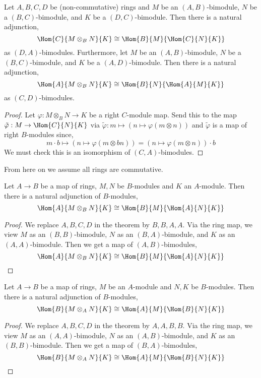\documentclass[12pt]{article}
\begin{document}
\begin{theorem}
Let $A, B, C, D$ be (non-commutative) rings and $M$ be an $(A, B)$-bimodule, $N$ be a $(B, C)$-bimodule, and $K$ be a $(D, C)$-bimodule. Then there is a natural adjunction,
\[ \Hom{C}{M \otimes_B N}{K} \cong \Hom{B}{M}{\Hom{C}{N}{K}} \]
as $(D, A)$-bimodules. Furthermore, let $M$ be an $(A, B)$-bimodule, $N$ be a $(B, C)$-bimodule, and $K$ be a $(A, D)$-bimodule. Then there is a natural adjunction,
\[ \Hom{A}{M \otimes_B N}{K} \cong \Hom{B}{N}{\Hom{A}{M}{K}} \]
as $(C, D)$-bimodules.
\end{theorem}

\begin{proof}
Let $\varphi : M \otimes_B N \to K$ be a right $C$-module map. Send this to the map $\tilde{\varphi} : M \to \Hom{C}{N}{K}$ via $\tilde{\varphi} : m \mapsto (n \mapsto \varphi(m \otimes n))$ and $\tilde{\varphi}$ is a map of right $B$-modules since,
\[ m \cdot b \mapsto (n \mapsto \varphi(m \otimes b n)) = (n \mapsto \varphi(m \otimes n)) \cdot b \]
We must check this is an isomorphism of $(C, A)$-bimodules. 
\end{proof}

\begin{rmk}
From here on we assume all rings are commutative. 
\end{rmk}

\begin{cor}
Let $A \to B$ be a map of rings, $M, N$ be $B$-modules and $K$ an $A$-module. Then there is a natural adjunction of $B$-modules,
\[ \Hom{A}{M \otimes_B N}{K} \cong \Hom{B}{M}{\Hom{A}{N}{K}} \]
\end{cor}

\begin{proof}
We replace $A,B,C,D$ in the theorem by $B,B,A,A$. Via the ring map, we view $M$ as an $(B,B)$-bimodule, $N$ as an $(B, A)$-bimodule, and $K$ as an $(A, A)$-bimodule. Then we get a map of $(A, B)$-bimodules,
\[ \Hom{A}{M \otimes_B N}{K} \cong \Hom{B}{M}{\Hom{A}{N}{K}} \]
\end{proof}

\begin{cor}
Let $A \to B$ be a map of rings, $M$ be an $A$-module and $N, K$ be $B$-modules. Then there is a natural adjunction of $B$-modules,
\[ \Hom{B}{M \otimes_A N}{K} \cong \Hom{A}{M}{\Hom{B}{N}{K}} \]
\end{cor}

\begin{proof}
We replace $A,B,C,D$ in the theorem by $A,A,B,B$. Via the ring map, we view $M$ as an $(A,A)$-bimodule, $N$ as an $(A, B)$-bimodule, and $K$ as an $(B, B)$-bimodule. Then we get a map of $(B, A)$-bimodules,
\[ \Hom{B}{M \otimes_A N}{K} \cong \Hom{A}{M}{\Hom{B}{N}{K}} \]
\end{proof}
\end{document}
